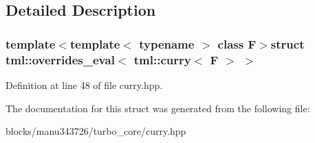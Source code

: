 \subsection{Detailed Description}
\subsubsection*{template$<$template$<$ typename $>$ class F$>$struct tml\+::overrides\+\_\+eval$<$ tml\+::curry$<$ F $>$ $>$}



Definition at line 48 of file curry.\+hpp.



The documentation for this struct was generated from the following file\+:\begin{DoxyCompactItemize}
\item 
blocks/manu343726/turbo\+\_\+core/curry.\+hpp\end{DoxyCompactItemize}
